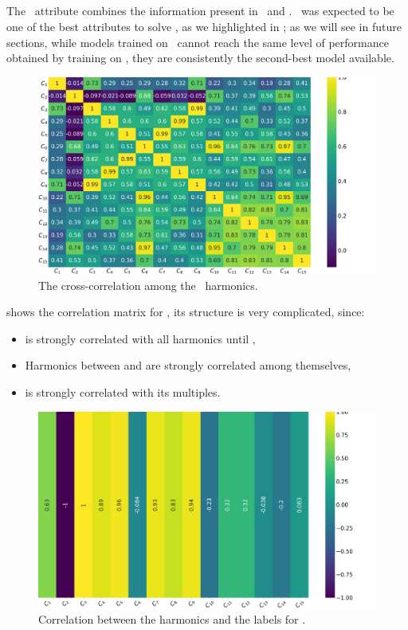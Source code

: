 \subsection{\cnmod}
\label{sec:cnmod}
The \cnmod\ attribute combines the information present in \an\ and \bn. \cnmod\ was expected to be one
of the best attributes to solve \qrp, as we highlighted in ; as we will see in
future sections, while models trained on \cnmod\ cannot reach the same level of performance obtained
by training on \an, they are consistently the second-best model available.
\begin{figure}[!ht]
	\centering
	\includegraphics[width=\linewidth]{img/Cnmod_corr_matrix.png}
	\caption{The cross-correlation among the \cnmod\ harmonics.} \label{fig:cnmod-corr}
\end{figure}

 shows the correlation matrix for \cnmod, its structure is very complicated,
since:
\begin{itemize}
	\item \cnmod[2] is strongly correlated with all harmonics until \cnmod[9],
	\item Harmonics between \cnmod[10] and \cnmod[15] are strongly correlated among themselves,
	\item \cnmod[4] is strongly correlated with its multiples.
\end{itemize}
\begin{figure}[!ht]
	\centering
	\includegraphics[width=0.7\linewidth]{img/Cnmod_label_corr.png}
	\caption{Correlation between the harmonics and the labels for \cnmod.} \label{fig:cnmod-lcorr}
\end{figure}

